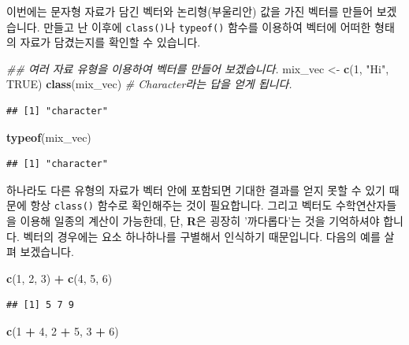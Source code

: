 \documentclass[]{book}
\newenvironment{Shaded}{\begin{snugshade}}{\end{snugshade}}
\newcommand{\CommentTok}[1]{\textcolor[rgb]{0.56,0.35,0.01}{\textit{#1}}}
\newcommand{\DecValTok}[1]{\textcolor[rgb]{0.00,0.00,0.81}{#1}}
\newcommand{\KeywordTok}[1]{\textcolor[rgb]{0.13,0.29,0.53}{\textbf{#1}}}
\newcommand{\NormalTok}[1]{#1}
\newcommand{\OperatorTok}[1]{\textcolor[rgb]{0.81,0.36,0.00}{\textbf{#1}}}
\newcommand{\OtherTok}[1]{\textcolor[rgb]{0.56,0.35,0.01}{#1}}
\newcommand{\StringTok}[1]{\textcolor[rgb]{0.31,0.60,0.02}{#1}}
\begin{document}
이번에는 문자형 자료가 담긴 벡터와 논리형(부울리안) 값을 가진 벡터를 만들어 보겠습니다. 만들고 난 이후에 \texttt{class()}나 \texttt{typeof()} 함수를 이용하여 벡터에 어떠한 형태의 자료가 담겼는지를 확인할 수 있습니다.

\begin{Shaded}
\begin{Highlighting}[]
\CommentTok{## 여러 자료 유형을 이용하여 벡터를 만들어 보겠습니다.}
\NormalTok{mix_vec <-}\StringTok{ }\KeywordTok{c}\NormalTok{(}\DecValTok{1}\NormalTok{, }\StringTok{"Hi"}\NormalTok{, }\OtherTok{TRUE}\NormalTok{)}
\KeywordTok{class}\NormalTok{(mix_vec)  }\CommentTok{# Character라는 답을 얻게 됩니다.}
\end{Highlighting}
\end{Shaded}

\begin{verbatim}
## [1] "character"
\end{verbatim}

\begin{Shaded}
\begin{Highlighting}[]
\KeywordTok{typeof}\NormalTok{(mix_vec)}
\end{Highlighting}
\end{Shaded}

\begin{verbatim}
## [1] "character"
\end{verbatim}

하나라도 다른 유형의 자료가 벡터 안에 포함되면 기대한 결과를 얻지 못할 수 있기 때문에 항상 \texttt{class()} 함수로 확인해주는 것이 필요합니다. 그리고 벡터도 수학연산자들을 이용해 일종의 계산이 가능한데, 단, \textbf{R}은 굉장히 '까다롭다'는 것을 기억하셔야 합니다. 벡터의 경우에는 요소 하나하나를 구별해서 인식하기 때문입니다. 다음의 예를 살펴 보겠습니다.

\begin{Shaded}
\begin{Highlighting}[]
\KeywordTok{c}\NormalTok{(}\DecValTok{1}\NormalTok{, }\DecValTok{2}\NormalTok{, }\DecValTok{3}\NormalTok{) }\OperatorTok{+}\StringTok{ }\KeywordTok{c}\NormalTok{(}\DecValTok{4}\NormalTok{, }\DecValTok{5}\NormalTok{, }\DecValTok{6}\NormalTok{) }
\end{Highlighting}
\end{Shaded}

\begin{verbatim}
## [1] 5 7 9
\end{verbatim}

\begin{Shaded}
\begin{Highlighting}[]
\KeywordTok{c}\NormalTok{(}\DecValTok{1} \OperatorTok{+}\StringTok{ }\DecValTok{4}\NormalTok{, }\DecValTok{2} \OperatorTok{+}\StringTok{ }\DecValTok{5}\NormalTok{, }\DecValTok{3} \OperatorTok{+}\StringTok{ }\DecValTok{6}\NormalTok{)}
\end{Highlighting}
\end{Shaded}
\end{document}
